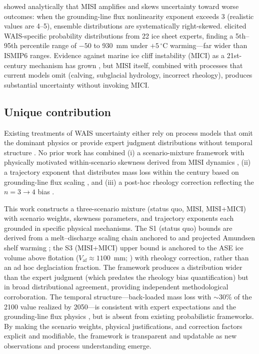 \documentclass[11pt]{article}
\begin{document}
\citet{Robel2019} showed analytically that MISI amplifies and skews uncertainty toward worse outcomes: when the grounding-line flux nonlinearity exponent exceeds 3 (realistic values are 4--5), ensemble distributions are systematically right-skewed. \citet{Bamber2019} elicited WAIS-specific probability distributions from 22 ice sheet experts, finding a 5th--95th percentile range of $-50$ to 930~mm under $+5\,^\circ$C warming---far wider than ISMIP6 ranges. Evidence against marine ice cliff instability (MICI) as a 21st-century mechanism has grown \citep{Morlighem2024, Clerc2019, Schlemm2022}, but MISI itself, combined with processes that current models omit (calving, subglacial hydrology, incorrect rheology), produces substantial uncertainty without invoking MICI.

\subsection{Unique contribution}

Existing treatments of WAIS uncertainty either rely on process models that omit the dominant physics \citep{Seroussi2020} or provide expert judgment distributions without temporal structure \citep{Bamber2019}. No prior work has combined (i) a scenario-mixture framework with physically motivated within-scenario skewness derived from MISI dynamics \citep{Robel2019}, (ii) a trajectory exponent that distributes mass loss within the century based on grounding-line flux scaling \citep{Schoof2007}, and (iii) a post-hoc rheology correction reflecting the $n = 3 \to 4$ bias \citep{Martin2026, GetraerMorlighem2025}.

This work constructs a three-scenario mixture (status quo, MISI, MISI+MICI) with scenario weights, skewness parameters, and trajectory exponents each grounded in specific physical mechanisms. The S1 (status quo) bounds are derived from a melt--discharge scaling chain anchored to \citet{Joughin2021} and projected Amundsen shelf warming \citep{Naughten2023}; the S3 (MISI+MICI) upper bound is anchored to the ASE ice volume above flotation ($V_{\mathrm{af}} \approx 1100$~mm; \citealp{Morlighem2020}) with rheology correction, rather than an ad hoc deglaciation fraction. The framework produces a distribution wider than the \citet{Bamber2019} expert judgment (which predates the rheology bias quantification) but in broad distributional agreement, providing independent methodological corroboration. The temporal structure---back-loaded mass loss with $\sim$30\% of the 2100 value realized by 2050---is consistent with expert expectations \citep{Bamber2019} and the grounding-line flux physics \citep{Robel2019}, but is absent from existing probabilistic frameworks. By making the scenario weights, physical justifications, and correction factors explicit and modifiable, the framework is transparent and updatable as new observations and process understanding emerge.
\end{document}
